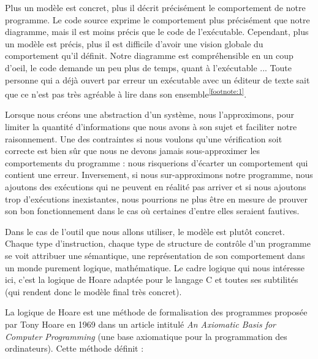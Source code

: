 \documentclass[middle]{zmdocument}
\begin{document}
Plus un modèle est concret, plus il décrit précisément le comportement de notre
programme. Le code source exprime le comportement plus précisément que notre 
diagramme, mais il est moins précis que le code de l'exécutable. Cependant, plus
un modèle est précis, plus il est difficile d'avoir une vision globale du 
comportement qu'il définit. Notre diagramme est compréhensible en un coup d'oeil,
le code demande un peu plus de temps, quant à l'exécutable ... Toute personne qui
a déjà ouvert par erreur un exécutable avec un éditeur de texte sait que ce n'est
pas très agréable à lire dans son ensemble\textsuperscript{\ref{footnote:1}}.



Lorsque nous créons une abstraction d'un système, nous l'approximons, pour limiter
la quantité d'informations que nous avons à son sujet et faciliter notre 
raisonnement. Une des contraintes si nous voulons qu'une vérification soit 
correcte est bien sûr que nous ne devons jamais sous-approximer les comportements 
du programme : nous risquerions d'écarter un comportement qui contient une erreur.
Inversement, si nous sur-approximons notre programme, nous ajoutons des exécutions
qui ne peuvent en réalité pas arriver et si nous ajoutons trop d'exécutions 
inexistantes, nous pourrions ne plus être en mesure de prouver son bon 
fonctionnement dans le cas où certaines d'entre elles seraient fautives.



Dans le cas de l'outil que nous allons utiliser, le modèle est plutôt concret. 
Chaque type d'instruction, chaque type de structure de contrôle d'un programme 
se voit attribuer une sémantique, une représentation de son comportement dans 
un monde purement logique, mathématique. Le cadre logique qui nous intéresse 
ici, c'est la logique de Hoare adaptée pour le langage C et toutes ses 
subtilités (qui rendent donc le modèle final très concret).








La logique de Hoare est une méthode de formalisation des programmes proposée 
par Tony Hoare en 1969 dans un article intitulé \textit{An Axiomatic Basis for 
Computer Programming} (une base axiomatique pour la programmation des 
ordinateurs). Cette méthode définit :
\end{document}
